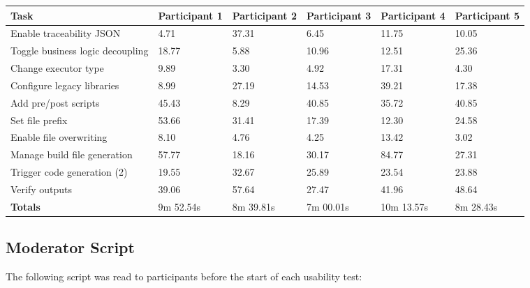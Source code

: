 \begin{table}[htbp]
	\centering
	\caption{Usability Task Performance Summary (Tasks 11–20 and Totals)}
	\label{tab:ttpt-2}
	\begin{xltabular}{\textwidth}{X X X X X X}
		\toprule
		\textbf{Task} & Participant 1 & Participant 2 & Participant 3 & Participant 4 & Participant 5 \\
		\midrule
		Enable traceability JSON 			& 4.71 & 37.31 & 6.45 & 11.75 & 10.05 \\
		Toggle business logic decoupling 	& 18.77 & 5.88 & 10.96 & 12.51 & 25.36 \\
		Change executor type 				& 9.89 & 3.30 & 4.92 & 17.31 & 4.30 \\
		Configure legacy libraries 			& 8.99 & 27.19 & 14.53 & 39.21 & 17.38 \\
		Add pre/post scripts 				& 45.43 & 8.29 & 40.85 & 35.72 & 40.85 \\
		Set file prefix 					& 53.66 & 31.41 & 17.39 & 12.30 & 24.58 \\
		Enable file overwriting				& 8.10 & 4.76 & 4.25 & 13.42 & 3.02 \\
		Manage build file generation 		& 57.77 & 18.16 & 30.17 & 84.77 & 27.31 \\
		Trigger code generation (2)			& 19.55 & 32.67 & 25.89 & 23.54 & 23.88 \\
		Verify outputs 						& 39.06 & 57.64 & 27.47 & 41.96 & 48.64 \\
		\midrule
		\textbf{Totals} & 9m 52.54s & 8m 39.81s & 7m 00.01s & 10m 13.57s & 8m 28.43s \\
		\bottomrule
	\end{xltabular}
\end{table}


\subsection{Moderator Script}
\label{app:mod_script}

The following script was read to participants before the start of each usability test:

